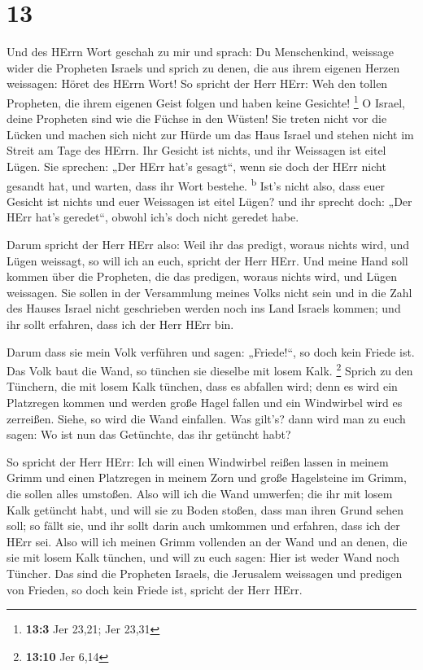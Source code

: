 \hypertarget{section-12}{%
\section{13}\label{section-12}}

 Und des HErrn Wort geschah zu mir und sprach:
 Du Menschenkind, weissage wider die Propheten Israels und
sprich zu denen, die aus ihrem eigenen Herzen weissagen: Höret des HErrn
Wort!  So spricht der Herr HErr: Weh den tollen Propheten,
die ihrem eigenen Geist folgen und haben keine Gesichte! \footnote{\textbf{13:3}
  Jer 23,21; Jer 23,31}  O Israel, deine Propheten sind
wie die Füchse in den Wüsten!  Sie treten nicht vor die
Lücken und machen sich nicht zur Hürde um das Haus Israel und stehen
nicht im Streit am Tage des HErrn.  Ihr Gesicht ist
nichts, und ihr Weissagen ist eitel Lügen. Sie sprechen: „Der HErr hat's
gesagt``, wenn sie doch der HErr nicht gesandt hat, und warten, dass ihr
Wort bestehe. \textsuperscript{b}  Ist's nicht also, dass
euer Gesicht ist nichts und euer Weissagen ist eitel Lügen? und ihr
sprecht doch: „Der HErr hat's geredet``, obwohl ich's doch nicht geredet
habe.

 Darum spricht der Herr HErr also: Weil ihr das predigt,
woraus nichts wird, und Lügen weissagt, so will ich an euch, spricht der
Herr HErr.  Und meine Hand soll kommen über die Propheten,
die das predigen, woraus nichts wird, und Lügen weissagen. Sie sollen in
der Versammlung meines Volks nicht sein und in die Zahl des Hauses
Israel nicht geschrieben werden noch ins Land Israels kommen; und ihr
sollt erfahren, dass ich der Herr HErr bin.

 Darum dass sie mein Volk verführen und sagen:
„Friede!{}``, so doch kein Friede ist. Das Volk baut die Wand, so
tünchen sie dieselbe mit losem Kalk. \footnote{\textbf{13:10} Jer 6,14}
 Sprich zu den Tünchern, die mit losem Kalk tünchen, dass
es abfallen wird; denn es wird ein Platzregen kommen und werden große
Hagel fallen und ein Windwirbel wird es zerreißen. 
Siehe, so wird die Wand einfallen. Was gilt's? dann wird man zu euch
sagen: Wo ist nun das Getünchte, das ihr getüncht habt?

 So spricht der Herr HErr: Ich will einen Windwirbel
reißen lassen in meinem Grimm und einen Platzregen in meinem Zorn und
große Hagelsteine im Grimm, die sollen alles umstoßen. 
Also will ich die Wand umwerfen; die ihr mit losem Kalk getüncht habt,
und will sie zu Boden stoßen, dass man ihren Grund sehen soll; so fällt
sie, und ihr sollt darin auch umkommen und erfahren, dass ich der HErr
sei.  Also will ich meinen Grimm vollenden an der Wand
und an denen, die sie mit losem Kalk tünchen, und will zu euch sagen:
Hier ist weder Wand noch Tüncher.  Das sind die Propheten
Israels, die Jerusalem weissagen und predigen von Frieden, so doch kein
Friede ist, spricht der Herr HErr.

